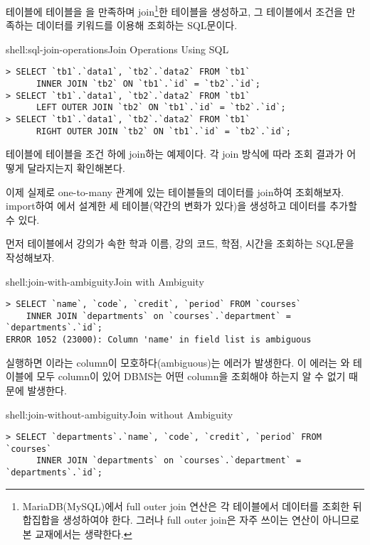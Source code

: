 \은  테이블에  테이블을 을 만족하며 join\footnote{MariaDB(MySQL)에서 full outer join 연산은 각 테이블에서 데이터를 조회한 뒤 합집합을 생성하여야 한다. 그러나 full outer join은 자주 쓰이는 연산이 아니므로 본 교재에서는 생략한다.}한 테이블을 생성하고, 그 테이블에서  조건을 만족하는 데이터를  키워드를 이용해 조회하는 SQL문이다.

\begin{shellenv}{shell:sql-join-operations}{Join Operations Using SQL}\begin{verbatim}
> SELECT `tb1`.`data1`, `tb2`.`data2` FROM `tb1`
      INNER JOIN `tb2` ON `tb1`.`id` = `tb2`.`id`;
> SELECT `tb1`.`data1`, `tb2`.`data2` FROM `tb1`
      LEFT OUTER JOIN `tb2` ON `tb1`.`id` = `tb2`.`id`;
> SELECT `tb1`.`data1`, `tb2`.`data2` FROM `tb1`
      RIGHT OUTER JOIN `tb2` ON `tb1`.`id` = `tb2`.`id`;
\end{verbatim}
\end{shellenv}

\는  테이블에  테이블을  조건 하에 join하는 예제이다. 각 join 방식에 따라 조회 결과가 어떻게 달라지는지 확인해본다.

이제 실제로 one-to-many 관계에 있는 테이블들의 데이터를 join하여 조회해보자. \을 import하여 에서 설계한 세 테이블(약간의 변화가 있다)을 생성하고 데이터를 추가할 수 있다.

먼저  테이블에서 강의가 속한 학과 이름, 강의 코드, 학점, 시간을 조회하는 SQL문을 작성해보자.

\begin{shellenv}{shell:join-with-ambiguity}{Join with Ambiguity}\begin{verbatim}
> SELECT `name`, `code`, `credit`, `period` FROM `courses`
    INNER JOIN `departments` on `courses`.`department` = `departments`.`id`;
ERROR 1052 (23000): Column 'name' in field list is ambiguous
\end{verbatim}
\end{shellenv}

\를 실행하면 이라는 column이 모호하다(ambiguous)는 에러가 발생한다. 이 에러는 와  테이블에 모두  column이 있어 DBMS는 어떤  column을 조회해야 하는지 알 수 없기 때문에 발생한다.

\begin{shellenv}{shell:join-without-ambiguity}{Join without Ambiguity}\begin{verbatim}
> SELECT `departments`.`name`, `code`, `credit`, `period` FROM `courses`
      INNER JOIN `departments` on `courses`.`department` = `departments`.`id`;
\end{verbatim}
\end{shellenv}

